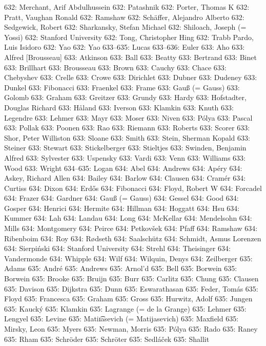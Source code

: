 632: Merchant, Arif Abdulhussein
632: Patashnik
632: Porter, Thomas K
632: Pratt, Vaughan Ronald
632: Ramshaw
632: Sch\"affer, Alejandro Alberto
632: Sedgewick, Robert
632: Sharkansky, Stefan Michael
632: Shiloach, Joseph (= Yossi)
632: Stanford University
632: Tong, Christopher Hing
632: Trabb Pardo, Luis Isidoro
632: Yao
632: Yao
633--635: Lucas
633--636: Euler
633: Aho
633: Alfred [Brousseau]
633: Atkinson
633: Ball
633: Beatty
633: Bertrand
633: Binet
633: Brillhart
633: Brousseau
633: Brown
633: Cauchy
633: Chace
633: Chebyshev
633: Crelle
633: Crowe
633: Dirichlet
633: Dubner
633: Dudeney
633: Dunkel
633: Fibonacci
633: Fraenkel
633: Frame
633: Gau{\ss} (= Gauss)
633: Golomb
633: Graham
633: Greitzer
633: Grundy
633: Hardy
633: Hofstadter, Douglas Richard
633: H{\aa}land
633: Iverson
633: Klamkin
633: Knuth
633: Legendre
633: Lehmer
633: Mayr
633: Moser
633: Niven
633: P\'olya
633: Pascal
633: Pollak
633: Poonen
633: Rao
633: Riemann
633: Roberts
633: Scorer
633: Shor, Peter Williston
633: Sloane
633: Smith
633: Stein, Sherman Kopald
633: Steiner
633: Stewart
633: Stickelberger
633: Stieltjes
633: Swinden, Benjamin Alfred
633: Sylvester
633: Uspensky
633: Vardi
633: Venn
633: Williams
633: Wood
633: Wright
634--635: Logan
634: Abel
634: Andrews
634: Ap\'ery
634: Askey, Richard Allen
634: Bailey
634: Barlow
634: Clausen
634: Cram\'er
634: Curtiss
634: Dixon
634: Erd\H os
634: Fibonacci
634: Floyd, Robert W
634: Forcadel
634: Frazer
634: Gardner
634: Gau{\ss} (= Gauss)
634: Gessel
634: Good
634: Gosper
634: Henrici
634: Hermite
634: Hillman
634: Hoggatt
634: Hsu
634: Kummer
634: Lah
634: Landau
634: Long
634: McKellar
634: Mendelsohn
634: Mills
634: Montgomery
634: Peirce
634: Petkov\v{s}ek
634: Pfaff
634: Ramshaw
634: Ribenboim
634: Roy
634: R{\o}dseth
634: Saalsch\"utz
634: Schmidt, Asmus Lorenzen
634: Sierpi\'nski
634: Stanford University
634: Strehl
634: Theisinger
634: Vandermonde
634: Whipple
634: Wilf
634: Wilquin, Denys
634: Zeilberger
635: Adams
635: Andr\'e
635: Andrews
635: Arnol'd
635: Bell
635: Borwein
635: Borwein
635: Brooke
635: Bruijn
635: Burr
635: Carlitz
635: Chung
635: Clausen
635: Davison
635: Dijkstra
635: Dunn
635: Eswarathasan
635: Feder, Tom\'as
635: Floyd
635: Francesca
635: Graham
635: Gross
635: Hurwitz, Adolf
635: Jungen
635: Kauck\'y
635: Klamkin
635: Lagrange (= de la Grange)
635: Lehmer
635: Lengyel
635: Levine
635: Mati{\t\i}asevich (= Matijasevich)
635: Maxfield
635: Mirsky, Leon
635: Myers
635: Newman, Morris
635: P\'olya
635: Rado
635: Raney
635: Rham
635: Schr\"oder
635: Schr\"oter
635: Sedl\'a\v cek
635: Shallit
